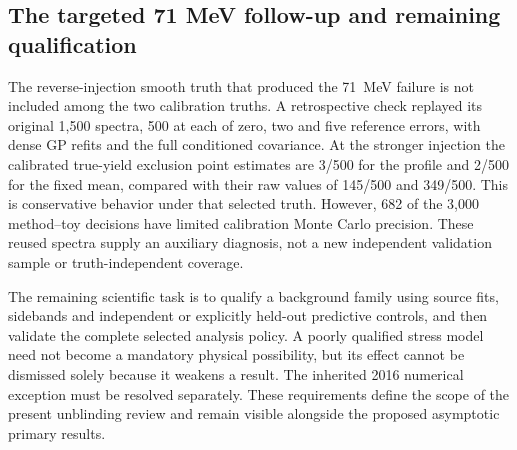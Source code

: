 \subsection{The targeted 71 MeV follow-up and remaining qualification}
The reverse-injection smooth truth that produced the 71~MeV failure is
not included among the two calibration truths. A retrospective check
replayed its original 1,500 spectra, 500 at each of zero, two and five
reference errors, with dense GP refits and the full conditioned covariance.
At the stronger injection the calibrated true-yield exclusion point
estimates are 3/500 for the profile and 2/500 for the fixed mean, compared
with their raw values of 145/500 and 349/500. This is conservative behavior
under that selected truth. However, 682 of the 3,000 method--toy decisions
have limited calibration Monte Carlo precision. These reused spectra
supply an auxiliary diagnosis, not a new independent validation sample
or truth-independent coverage.

The remaining scientific task is to qualify a background family using
source fits, sidebands and independent or explicitly held-out predictive
controls, and then validate the complete selected analysis policy. A
poorly qualified stress model need not become a mandatory physical
possibility, but its effect cannot be dismissed solely because it weakens
a result. The inherited 2016 numerical exception must be resolved
separately. These requirements define the scope of the present unblinding
review and remain visible alongside the proposed asymptotic primary results.
